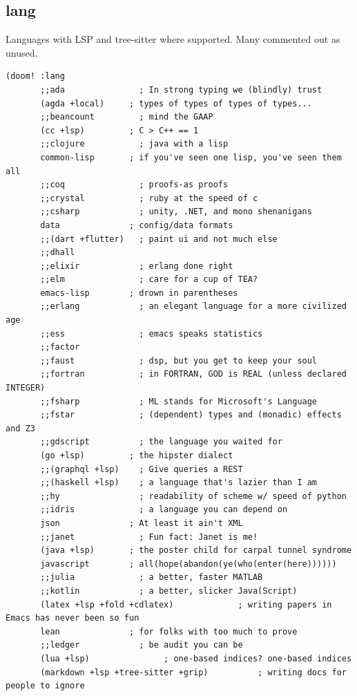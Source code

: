 \documentclass[11pt]{article}
\begin{document}
\subsection{lang}
\label{sec:org0e75e27}
Languages with LSP and tree-sitter where supported. Many commented
out as unused.

\begin{verbatim}
(doom! :lang
       ;;ada               ; In strong typing we (blindly) trust
       (agda +local)     ; types of types of types of types...
       ;;beancount         ; mind the GAAP
       (cc +lsp)         ; C > C++ == 1
       ;;clojure           ; java with a lisp
       common-lisp       ; if you've seen one lisp, you've seen them all
       ;;coq               ; proofs-as proofs
       ;;crystal           ; ruby at the speed of c
       ;;csharp            ; unity, .NET, and mono shenanigans
       data              ; config/data formats
       ;;(dart +flutter)   ; paint ui and not much else
       ;;dhall
       ;;elixir            ; erlang done right
       ;;elm               ; care for a cup of TEA?
       emacs-lisp        ; drown in parentheses
       ;;erlang            ; an elegant language for a more civilized age
       ;;ess               ; emacs speaks statistics
       ;;factor
       ;;faust             ; dsp, but you get to keep your soul
       ;;fortran           ; in FORTRAN, GOD is REAL (unless declared INTEGER)
       ;;fsharp            ; ML stands for Microsoft's Language
       ;;fstar             ; (dependent) types and (monadic) effects and Z3
       ;;gdscript          ; the language you waited for
       (go +lsp)         ; the hipster dialect
       ;;(graphql +lsp)    ; Give queries a REST
       ;;(haskell +lsp)    ; a language that's lazier than I am
       ;;hy                ; readability of scheme w/ speed of python
       ;;idris             ; a language you can depend on
       json              ; At least it ain't XML
       ;;janet             ; Fun fact: Janet is me!
       (java +lsp)       ; the poster child for carpal tunnel syndrome
       javascript        ; all(hope(abandon(ye(who(enter(here))))))
       ;;julia             ; a better, faster MATLAB
       ;;kotlin            ; a better, slicker Java(Script)
       (latex +lsp +fold +cdlatex)             ; writing papers in Emacs has never been so fun
       lean              ; for folks with too much to prove
       ;;ledger            ; be audit you can be
       (lua +lsp)               ; one-based indices? one-based indices
       (markdown +lsp +tree-sitter +grip)          ; writing docs for people to ignore

\end{verbatim}
\end{document}

